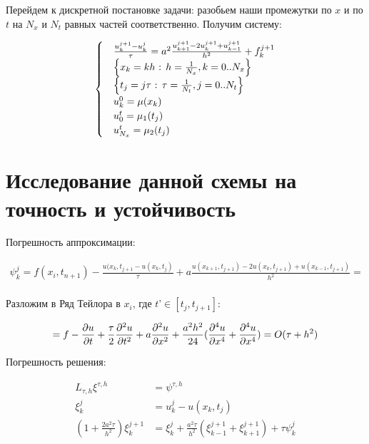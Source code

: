 \documentclass[12pt,a4paper]{scrartcl}
\begin{document}
Перейдем к дискретной постановке задачи: разобьем наши промежутки по $x$ и по $t$ на $N_x$ и $N_t$ равных частей соответственно. Получим систему:

\begin{align}
    \begin{cases}
        &\frac{u^{j+1}_k-u^{j}_k}{\tau} = a^{2} \frac{u^{j+1}_{k+1}-2 u^{j+1}_k+u^{j+1}_{k-1}}{h^{2}}+f^{j+1}_k\\
        &\Bigl\{x_k = k h $ : $ h = \frac {1}{N_x}, k = 0 ..N_x\Bigr\}\\
        &\Bigl\{t_j = j \tau $ : $ \tau =\frac {1}{N_t}, j = 0 ..N_t \Bigr\}\\ \label{dis}
        &u^{0}_k = \mu(x_k) \\
        &u^{t}_0 = \mu_1(t_j) \\
        &u^{t}_{N_{x}} = \mu_2(t_j) \\ 
    \end{cases}
\end{align}

\section{Исследование данной схемы на точность и устойчивость}

Погрешность аппроксимации:

\begin{align*}
    \psi^{j}_k = f(x_i,t_{n+1}) - \frac{u(x_k,t_{j+1}-u(x_k,t_j)}{\tau}+a \frac{u(x_{k+1},t_{j+1}) - 2 u(x_k,t_{j+1})+u(x_{k-1},t_{j+1})}{h^{2}} = \\
\end{align*}

Разложим в Ряд Тейлора в $x_i$, где $t$'$ \in [t_j,t_{j+1}]$:

\[
=f- \pdv{u}{t}+ \frac{\tau}{2}\pdv[2]{u}{t}(x_{i},t^{'})+a \pdv[2]{u}{x}+ \frac{a^{2} h^{2}}{24}(\pdv[4]{u}{x}(x^{-},t_{j+1})+\pdv[4]{u}{x}(x^{+},t_{j+1})) = O(\tau+h^{2})\\   
\]

Погрешность решения:

\begin{align*}
    L_{\tau,h} \xi^{\tau,h} &= \psi^{\tau,h}\\
    \xi^{j}_{k} &= u^{j}_k - u(x_k,t_j) \\
    (1+ \frac{2 a^{2} \tau}{h^{2}}) \xi^{j+1}_{k} &= \xi^{j}_{k}+ \frac{a^{2} \tau}{h^{2}} (\xi^{j+1}_{k-1}+\xi^{j+1}_{k+1}) +\tau \psi^{j}_k\\
\end{align*}
\end{document}
